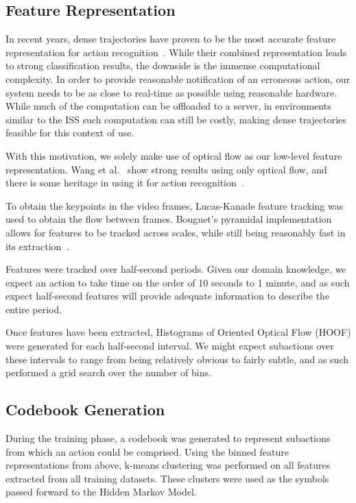 \documentclass[10pt,twocolumn,letterpaper]{article}
\begin{document}
\subsection{Feature Representation}
In recent years, dense trajectories have proven to be the most accurate feature representation for action recognition~\cite{wang2011action}. While their combined representation leads to strong classification results, the downside is the immense computational complexity. In order to provide reasonable notification of an erroneous action, our system needs to be as close to real-time as possible using reasonable hardware. While much of the computation can be offloaded to a server, in environments similar to the ISS such computation can still be costly, making dense trajectories feasible for this context of use.

With this motivation, we solely make use of optical flow as our low-level feature representation. Wang et al.~\cite{wang2011action} show strong results using only optical flow, and there is some heritage in using it for action recognition~\cite{chaudhry2009histograms}.

To obtain the keypoints in the video frames, Lucas-Kanade feature tracking was used to obtain the flow between frames. Bouguet's pyramidal implementation allows for features to be tracked across scales, while still being reasonably fast in its extraction~\cite{bouguet2001pyramidal}.

Features were tracked over half-second periods. Given our domain knowledge, we expect an action to take time on the order of 10 seconds to 1 minute, and as such expect half-second features will provide adequate information to describe the entire period.

Once features have been extracted, Histograms of Oriented Optical Flow (HOOF) were generated for each half-second interval. We might expect subactions over these intervals to range from being relatively obvious to fairly subtle, and as such performed a grid search over the number of bins.

\subsection{Codebook Generation}
During the training phase, a codebook was generated to represent subactions from which an action could be comprised. Using the binned feature representations from above, k-means clustering was performed on all features extracted from all training datasets. These clusters were used as the symbols passed forward to the Hidden Markov Model.
\end{document}
